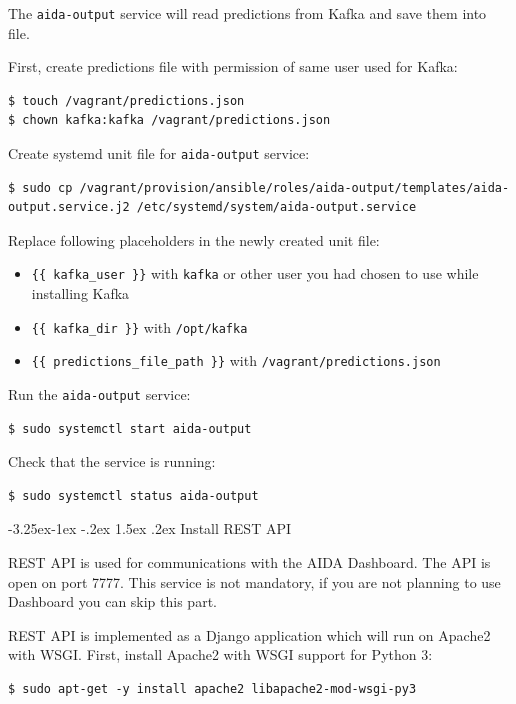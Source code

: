 \documentclass[a4paper]{article} %
\makeatletter
\renewcommand{\normalsize}{\fontsize{12}{15}\selectfont\color{textcolor}}
\renewcommand\subsubsection{\@startsection{subsubsection}{3}{\z@}%
                   {-3.25ex\@plus -1ex \@minus -.2ex}%
                   {1.5ex \@plus .2ex}%
                   {\normalfont\sffamily\normalsize\bfseries\color{projectcolor}}}
\makeatother
\begin{document}
The \texttt{aida-output} service will read predictions from Kafka and save them into file.

First, create predictions file with permission of same user used for Kafka:
\begin{lstlisting}
$ touch /vagrant/predictions.json
$ chown kafka:kafka /vagrant/predictions.json
\end{lstlisting}

Create systemd unit file for \texttt{aida-output} service:
\begin{lstlisting}
$ sudo cp /vagrant/provision/ansible/roles/aida-output/templates/aida-output.service.j2 /etc/systemd/system/aida-output.service
\end{lstlisting}

Replace following placeholders in the newly created unit file:
\begin{itemize}[noitemsep,nolistsep]
\item \texttt{\{\{ kafka\_user \}\}} with \texttt{kafka} or other user you had chosen to use while installing Kafka
\item \texttt{\{\{ kafka\_dir \}\}} with \texttt{/opt/kafka}
\item \texttt{\{\{ predictions\_file\_path \}\}} with \texttt{/vagrant/predictions.json}
\end{itemize}

Run the \texttt{aida-output} service:
\begin{lstlisting}
$ sudo systemctl start aida-output
\end{lstlisting}

Check that the service is running:
\begin{lstlisting}
$ sudo systemctl status aida-output
\end{lstlisting}


\subsubsection{Install REST API}

REST API is used for communications with the AIDA Dashboard. The API is open on port 7777. This service is not mandatory, if you are not planning to use Dashboard you can skip this part.

REST API is implemented as a Django application which will run on Apache2 with WSGI. First, install Apache2 with WSGI support for Python 3:
\begin{lstlisting}
$ sudo apt-get -y install apache2 libapache2-mod-wsgi-py3
\end{lstlisting}
\end{document}

